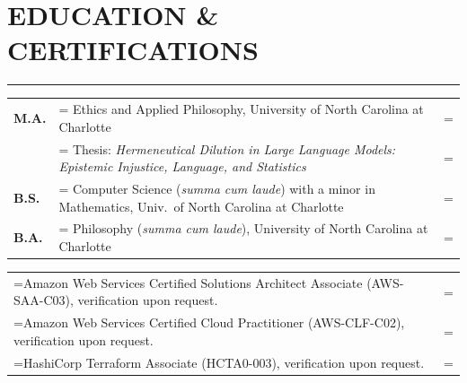\documentclass{article}
\begin{document}
\section*{\normalsize{EDUCATION \& CERTIFICATIONS}}
\vspace{-1.8em}
\noindent\rule{\textwidth}{.5pt}
\renewcommand{\arraystretch}{1.35}

\vspace{-.75em}
\hspace{-1em}
\begin{tabularx}{\textwidth}{
     >{\raggedright\arraybackslash}p{2.5em}
     >{\raggedright\arraybackslash\hsize=1.97\hsize\linewidth=\hsize}X
     >{\raggedleft\arraybackslash\hsize=0.03\hsize\linewidth=\hsize}X }
    \textbf{M.A.} & Ethics and Applied Philosophy, University of North Carolina at Charlotte \\
     & Thesis: \textit{Hermeneutical Dilution in Large Language Models: Epistemic Injustice, Language, and Statistics} & \\
    \textbf{B.S.} & Computer Science (\textit{summa cum laude}) with a minor in Mathematics, Univ.\ of North Carolina at Charlotte & \\
    \textbf{B.A.} & Philosophy (\textit{summa cum laude}), University of North Carolina at Charlotte & 
\end{tabularx}

\vspace*{1em}

\hspace{-1em}
\begin{tabularx}{\textwidth}{
     >{\raggedright\arraybackslash\hsize=1.97\hsize\linewidth=\hsize}X
     >{\raggedleft\arraybackslash\hsize=0.03\hsize\linewidth=\hsize}X }
    Amazon Web Services Certified Solutions Architect Associate (AWS-SAA-C03), verification upon request. &\\
    Amazon Web Services Certified Cloud Practitioner (AWS-CLF-C02), verification upon request. &\\
    HashiCorp Terraform Associate (HCTA0-003), verification upon request. &\\
 \end{tabularx}


\end{document}
